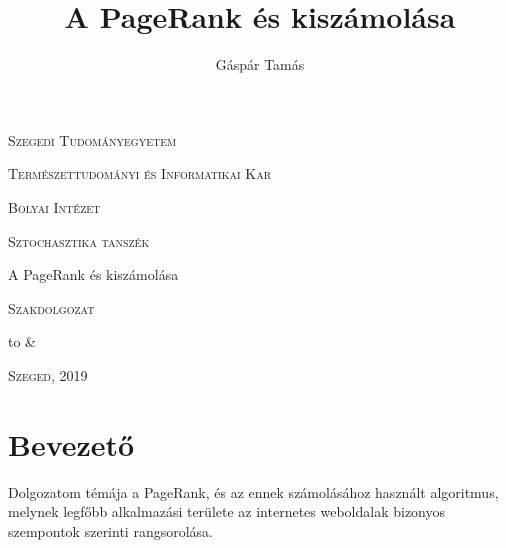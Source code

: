 \documentclass[12pt,a4paper]{article}
\author{Gáspár Tamás}
\title{A PageRank és kiszámolása}
\date{}
\begin{document}

\thispagestyle{empty}
\centerline{\textsc{\Large{Szegedi Tudományegyetem}}}
\vspace{0.3 cm}
\centerline{\textsc{\Large{Természettudományi és Informatikai Kar}}}

\vspace*{2 cm}

\centerline{\textsc{\Large{Bolyai Intézet}}}
\vspace{0.3 cm}
\centerline{\textsc{\Large{Sztochasztika tanszék}}}

\vspace{3 cm}

\centerline{\LARGE{A PageRank és kiszámolása}}
\vspace{0.5 cm}
\centerline{\Large{\textsc{Szakdolgozat}}}

\vspace{3 cm}

\begin{center}
	\begin{tabu} to \textwidth { X[l]  X[r] }
		 &
		  \\
	\end{tabu}
\end{center}

\vspace{3 cm}

\centerline{\Large{\textsc{Szeged, 2019}}}

\newpage
\thispagestyle{empty}

\tableofcontents

\newpage
\setcounter{page}{1}
\fontsize{12}{16}\selectfont

\section{Bevezető}

Dolgozatom témája a PageRank, és az ennek számolásához használt algoritmus, melynek legfőbb alkalmazási területe az internetes weboldalak bizonyos szempontok szerinti rangsorolása.
\end{document}
